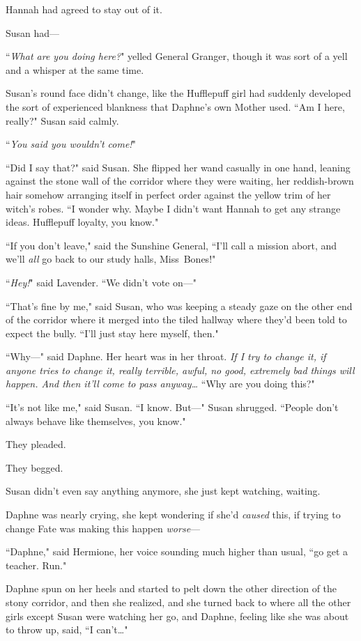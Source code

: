 Hannah had agreed to stay out of it.

Susan had—

\later

``\emph{What are you doing here?}" yelled General Granger, though it was sort of a yell and a whisper at the same time.

Susan's round face didn't change, like the Hufflepuff girl had suddenly developed the sort of experienced blankness that Daphne's own Mother used. ``Am I here, really?" Susan said calmly.

``\emph{You said you wouldn't come!}"

``Did I say that?" said Susan. She flipped her wand casually in one hand, leaning against the stone wall of the corridor where they were waiting, her reddish-brown hair somehow arranging itself in perfect order against the yellow trim of her witch's robes. ``I wonder why. Maybe I didn't want Hannah to get any strange ideas. Hufflepuff loyalty, you know."

``If you don't leave," said the Sunshine General, ``I'll call a mission abort, and we'll \emph{all} go back to our study halls, Miss~Bones!"

``\emph{Hey!}" said Lavender. ``We didn't vote on—"

``That's fine by me," said Susan, who was keeping a steady gaze on the other end of the corridor where it merged into the tiled hallway where they'd been told to expect the bully. ``I'll just stay here myself, then."

``Why—" said Daphne. Her heart was in her throat. \emph{If I try to change it, if \emph{anyone} tries to change it, really terrible, awful, no good, extremely bad things will happen. And then it'll come to pass anyway{\ldots}} ``Why are you doing this?"

``It's not like me," said Susan. ``I know. But—" Susan shrugged. ``People don't always behave like themselves, you know."

They pleaded.

They begged.

Susan didn't even say anything anymore, she just kept watching, waiting.

Daphne was nearly crying, she kept wondering if she'd \emph{caused} this, if trying to change Fate was making this happen \emph{worse}—

``Daphne," said Hermione, her voice sounding much higher than usual, ``go get a teacher. Run."

Daphne spun on her heels and started to pelt down the other direction of the stony corridor, and then she realized, and she turned back to where all the other girls except Susan were watching her go, and Daphne, feeling like she was about to throw up, said, ``I can't{\ldots}"

